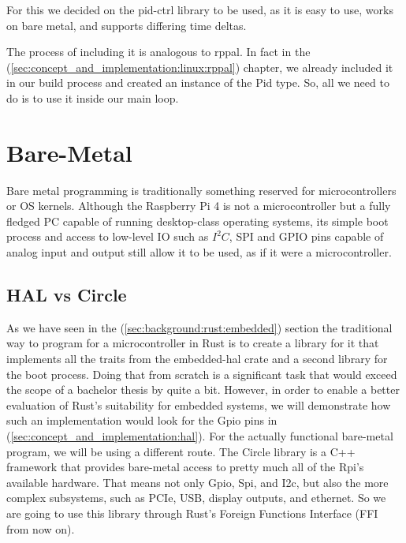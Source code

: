 For this we decided on the pid-ctrl library to be used, as it is easy to use, works on bare metal, and supports differing time deltas.

The process of including it is analogous to rppal.
In fact in the  (\ref{sec:concept_and_implementation:linux:rppal}) chapter,
we already included it in our build process and created an instance of the Pid type.
So, all we need to do is to use it inside our main loop.



\section{Bare-Metal}
\label{sec:concept_and_implementation:bare_metal}

Bare metal programming is traditionally something reserved for microcontrollers or OS kernels.
Although the Raspberry Pi 4 is not a microcontroller but a fully fledged PC capable of running desktop-class operating systems,
its simple boot process and access to low-level IO such as $I^2C$, SPI and GPIO pins capable of analog input and output still allow it to be used, as if it were a microcontroller.

\subsection{HAL vs Circle}
\label{sec:concept_and_implementation:bare-metal:hal}

As we have seen in the  (\ref{sec:background:rust:embedded}) section the traditional way to program for a microcontroller in Rust
is to create a library for it that implements all the traits from the embedded-hal crate and a second library for the boot process.
Doing that from scratch is a significant task that would exceed the scope of a bachelor thesis by quite a bit.
However, in order to enable a better evaluation of Rust's suitability for embedded systems, we will demonstrate how such an implementation would look for the Gpio pins in  (\ref{sec:concept_and_implementation:hal}).
For the actually functional bare-metal program, we will be using a different route.
The Circle library is a C++ framework that provides bare-metal access to pretty much all of the Rpi's available hardware.
That means not only Gpio, Spi, and I2c, but also the more complex subsystems, such as PCIe, USB, display outputs, and ethernet.
So we are going to use this library through Rust's Foreign Functions Interface (FFI from now on).

